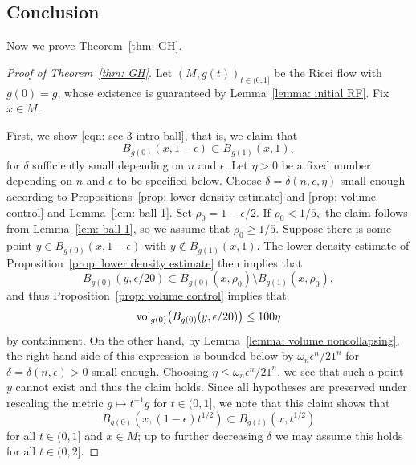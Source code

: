 \documentclass[11pt,reqno]{amsart}
\theoremstyle{remark}
\theoremstyle{definition}
\numberwithin{equation}{section}
\newcommand{\e}{{\epsilon}}
\newcommand{\om}{\omega}
\newcommand{\vol}{{\rm{vol}}}
\begin{document}
\subsection{Conclusion}\label{s3.3}
Now we prove Theorem~\ref{thm: GH}.
\begin{proof}[Proof of Theorem~\ref{thm: GH}]
Let $(M, g(t))_{t \in (0,1]}$ be the Ricci flow with $g(0)=g$, whose existence is guaranteed by Lemma~\ref{lemma: initial RF}. Fix $x \in M$.

First, we show \eqref{eqn: sec 3 intro ball}, that is, we claim that
\[
B_{g(0)}(x, 1-\e) \subset  B_{g(1)}(x, 1),
\]
for $\delta$ sufficiently small depending on $n$ and $\e$. Let $\eta>0$ be a fixed number depending on $n$ and $\e$ to be specified below. Choose $\delta = \delta(n,\e,\eta)$ small enough according to Propositions~\ref{prop: lower density estimate} and \ref{prop: volume control} and Lemma~\ref{lem: ball 1}.
Set $\rho_0 = 1- \e/2$.  
If $\rho_0 <1/5,$ the claim follows from Lemma~\ref{lem: ball 1}, so we assume that $\rho_0 \geq 1/5$. 
Suppose there is some 
point $y \in B_{g(0)}(x, 1-\e)$ with $y \not\in B_{g(1)}(x, 1).$ The lower density estimate of Proposition~\ref{prop: lower density estimate} then implies that
\[
B_{g(0)}(y, \e / 20) \subset B_{g(0)}(x, \rho_0) \setminus B_{g(1)}(x,\rho_0),
\]
and thus Proposition~\ref{prop: volume control} implies that
\begin{equation}
\vol_{g(0)}\big(B_{g(0)}(y, \e / 20 )\big)  \leq 100 \eta
\end{equation}
by containment. On the other hand, by Lemma~\ref{lemma: volume noncollapsing}, the right-hand side of this expression is bounded below by $\om_n \e^n/21^n$ for $\delta=\delta(n,\e)>0$ small enough. Choosing $\eta \leq \om_n \e^n/21^n$, we see that such a point $y$ cannot exist and thus the claim holds. Since all hypotheses are preserved under rescaling the metric $g \mapsto t^{-1}g$ for $t \in (0,1]$, we note that this claim shows that 
\[
B_{g(0)}(x, (1-\e) t^{1/2} ) \subset B_{g(t)}(x, t^{1/2})
\]
for all $t \in (0,1]$ and $x \in M$; up to further decreasing $\delta$ we may assume this holds for all $t\in (0,2]$.
\smallskip



\end{proof}
\end{document}
